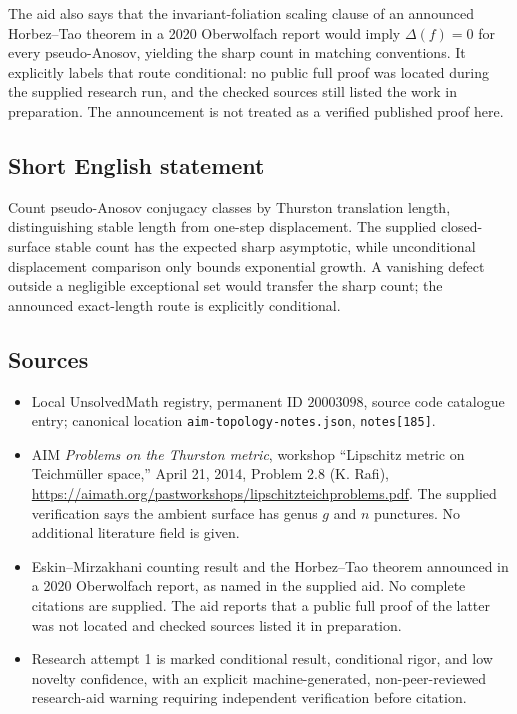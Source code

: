 \documentclass[11pt]{article}
\begin{document}
The aid also says that the invariant-foliation scaling clause of an announced Horbez--Tao theorem in a 2020 Oberwolfach report would imply $\Delta(f)=0$ for every pseudo-Anosov, yielding the sharp count in matching conventions. It explicitly labels that route conditional: no public full proof was located during the supplied research run, and the checked sources still listed the work in preparation. The announcement is not treated as a verified published proof here.
\subsection{Short English statement}
Count pseudo-Anosov conjugacy classes by Thurston translation length, distinguishing stable length from one-step displacement. The supplied closed-surface stable count has the expected sharp asymptotic, while unconditional displacement comparison only bounds exponential growth. A vanishing defect outside a negligible exceptional set would transfer the sharp count; the announced exact-length route is explicitly conditional.
\subsection{Sources}
\begin{itemize}
\item Local UnsolvedMath registry, permanent ID $20003098$, source code catalogue entry; canonical location \texttt{aim-topology-notes.json}, \texttt{notes[185]}.
\item AIM \emph{Problems on the Thurston metric}, workshop ``Lipschitz metric on Teichm\"uller space,'' April 21, 2014, Problem 2.8 (K. Rafi), \url{https://aimath.org/pastworkshops/lipschitzteichproblems.pdf}. The supplied verification says the ambient surface has genus $g$ and $n$ punctures. No additional literature field is given.
\item Eskin--Mirzakhani counting result and the Horbez--Tao theorem announced in a 2020 Oberwolfach report, as named in the supplied aid. No complete citations are supplied. The aid reports that a public full proof of the latter was not located and checked sources listed it in preparation.
\item Research attempt 1 is marked conditional result, conditional rigor, and low novelty confidence, with an explicit machine-generated, non-peer-reviewed research-aid warning requiring independent verification before citation.
\end{itemize}
\end{document}
